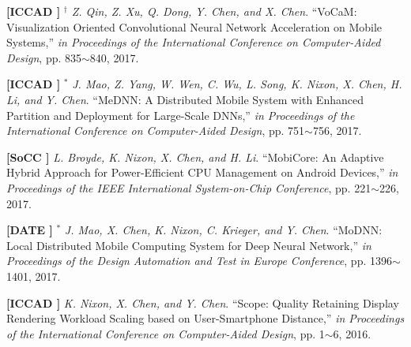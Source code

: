 	\textbf{[ICCAD ]}
	$^\dagger$
	\textsl{Z. Qin, Z. Xu, Q. Dong, Y. Chen, and X. Chen}.
		``VoCaM\@: Visualization Oriented Convolutional Neural Network Acceleration on Mobile Systems,''
		\textsl{in Proceedings of the International Conference on Computer-Aided Design}, pp. 835$\sim$840, 2017.
			\vspace{-3mm}

	\textbf{[ICCAD ]}
	$^\ast$
	\textsl{J. Mao, Z. Yang, W. Wen, C. Wu, L. Song, K. Nixon, X. Chen, H. Li, and Y. Chen}.
		``MeDNN\@: A Distributed Mobile System with Enhanced Partition and Deployment for Large-Scale DNNs,''
		\textsl{in Proceedings of the International Conference on Computer-Aided Design},  pp. 751$\sim$756, 2017.
			\vspace{-3mm}

	\textbf{[SoCC ]}\hspace{2mm}
	\textsl{L. Broyde, K. Nixon, X. Chen, and H. Li}.
		``MobiCore\@: An Adaptive Hybrid Approach for Power-Efficient CPU Management on Android Devices,''
		\textsl{in Proceedings of the IEEE International System-on-Chip Conference}, pp. 221$\sim$226, 2017.
			\vspace{-3mm}

	\textbf{[DATE ]}
	$^\ast$
	\textsl{J. Mao, X. Chen, K. Nixon, C. Krieger, and Y. Chen}.
		``MoDNN\@: Local Distributed Mobile Computing System for Deep Neural Network,''
		\textsl{in Proceedings of the Design Automation and Test in Europe Conference}, pp. 1396$\sim$1401, 2017.
			\vspace{-3mm}

	\textbf{[ICCAD ]}\hspace{2mm}
	\textsl{K. Nixon, X. Chen, and Y. Chen}.
		``Scope\@: Quality Retaining Display Rendering Workload Scaling based on User-Smartphone Distance,''
		\textsl{in Proceedings of the International Conference on Computer-Aided Design}, pp. 1$\sim$6, 2016.
			\vspace{-3mm}

